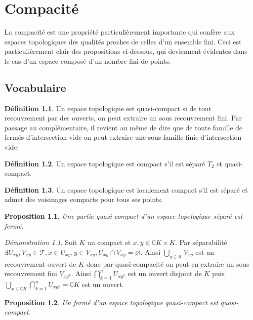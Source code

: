 \documentclass[a4paper, 11pt, french]{book}
\theoremstyle{plain} %
\newtheorem{proposition}{Proposition}
\theoremstyle{definition} %
\newtheorem{definition}{Définition}
\theoremstyle{remark} %
\newtheorem*{demonstration}{Démonstration}
\newcommand{\1}{\mathds{1}}
\newcommand\vide{\varnothing}
\begin{document}
\chapter{Compacité}

La compacité est une propriété particulièrement importante qui confère aux espaces topologiques des qualités proches de celles d’un ensemble fini.
Ceci est particulièrement clair des propositions ci-dessous, qui deviennent évidentes dans le cas d’un espace composé d’un nombre fini de points.

\section{Vocabulaire}

\begin{definition}
	Un espace topologique est quasi-compact si de tout recouvrement par des ouverts, on peut extraire un sous recouvrement fini.
	Par passage au complémentaire, il revient au même de dire que de toute famille de fermés d’intersection vide on peut extraire une sous-famille finie d’intersection vide.
\end{definition}

\begin{definition}
	Un espace topologique est compact s'il est séparé $T_2$ et quasi-compact.
\end{definition}

\begin{definition}
	Un espace topologique est localement compact s'il est séparé et admet des voisinages compacts pour tous ses points.
\end{definition}

\begin{proposition}
	Une partie quasi-compact d'un espace topologique séparé est fermé.
\end{proposition}

\begin{demonstration}
	Soit $K$ un compact et $x, y\in\complement K\times K$.
	Par séparabilité $\exists U_{xy}, V_{xy}\in\mathscr{T}, x\in U_{xy}, y\in V_{xy}, U_{xy}\cap V_{xy}=\vide$.
	Ainsi $\bigcup_{y\in K}V_{xy}$ est un recouvrement ouvert de $K$ donc par quasi-compacité on peut en extraire un sous recouvrement fini $V_{xy^k}$.
	Ainsi $\bigcap_{k=1}^nU_{xy^k}$ est un ouvert disjoint de $K$ puis $\bigcup_{x\in\complement K}\bigcap_{k=1}^nU_{xy^k}=\complement K$ est un ouvert.
\end{demonstration}

\begin{proposition}
	Un fermé d'un espace topologique quasi-compact est quasi-compact.
\end{proposition}
\end{document}
